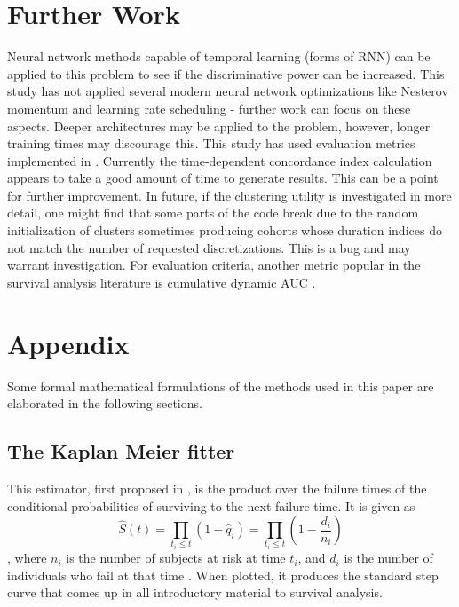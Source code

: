 \documentclass[%
 reprint,
 amsmath,amssymb,
 aps,nofootinbib
]{revtex4-2}
\begin{document}
\section{\label{morework}Further Work}
Neural network methods capable of temporal learning (forms of RNN) can be applied to this problem to see if the discriminative power can be increased. This study has not applied several modern neural network optimizations like Nesterov momentum and learning rate scheduling - further work can focus on these aspects. Deeper architectures may be applied to the problem, however, longer training times may discourage this. This study has used evaluation metrics implemented in \cite{kvamme_continuous_2019}. Currently the time-dependent concordance index calculation appears to take a good amount of time to generate results. This can be a point for further improvement. In future, if the clustering utility is investigated in more detail, one might find that some parts of the code break due to the random initialization of clusters sometimes producing cohorts whose duration indices do not match the number of requested discretizations. This is a bug and may warrant investigation. For evaluation criteria, another metric popular in the survival analysis literature is cumulative dynamic AUC \cite{cum_dyn_auc}.

\appendix

\section{\label{appdx}Appendix}

Some formal mathematical formulations of the methods used in this paper are elaborated in the following sections.

\subsection{\label{non_param}The Kaplan Meier fitter}

This estimator, first proposed in \cite{km_curve}, is the product over the failure times of the conditional probabilities of surviving to the next failure time. It is given as
\[
\hat{S}(t) = \prod_{t_i \le t}(1 - \hat{q}_i) = \prod_{t_i \le t}(1 - \frac{d_i}{n_i})
\],
where $n_i$ is the number of subjects at risk at time $t_i$, and $d_i$ is the number of individuals who fail at that time \cite{Moore_2016}. When plotted, it produces the standard step curve that comes up in all introductory material to survival analysis.
\end{document}
